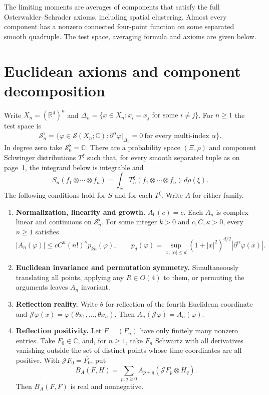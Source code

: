 \documentclass[11pt,letterpaper]{article}
\newcommand{\R}{\mathbb R}
\newcommand{\C}{\mathbb C}
\newcommand{\J}{\mathcal J}
\begin{document}
The limiting moments are averages of components that satisfy the full
Osterwalder--Schrader axioms, including spatial clustering. Almost every
component has a nonzero connected four-point function on some separated
smooth quadruple. The test space, averaging formula and axioms are given below.

\newpage
\section*{Euclidean axioms and component decomposition}

Write $X_n=(\R^4)^n$ and $\Delta_n=\{x\in X_n:x_i=x_j\text{ for some }i\ne j\}$.
For $n\ge1$ the test space is
\[
 \mathcal S_n^{\flat}
 =\{\varphi\in\mathcal S(X_n;\C):
          \partial^\alpha\varphi|_{\Delta_n}=0\ \text{for every multi-index }\alpha\}.
\]
In degree zero take $\mathcal S_0^{\flat}=\C$. There are a probability space
$(\Xi,\rho)$ and component Schwinger distributions $T^\xi$ such that, for
every smooth separated tuple as on page~1, the integrand below is integrable and
\[
 S_n(f_1\otimes\cdots\otimes f_n)
       =\int_\Xi T^\xi_n(f_1\otimes\cdots\otimes f_n)\,d\rho(\xi).
\]
The following conditions hold for $S$ and for each $T^\xi$. Write $A$ for
either family.
\begin{enumerate}
\item \textbf{Normalization, linearity and growth.}
$A_0(c)=c$. Each $A_n$ is complex linear and continuous on $\mathcal S_n^{\flat}$.
For some integer $k>0$ and $c,C,\kappa>0$, every $n\ge1$ satisfies
\[
 |A_n(\varphi)|\le cC^n(n!)^\kappa p_{kn}(\varphi),\qquad
 p_d(\varphi)=\sup_{x,\,|\alpha|\le d}
             (1+|x|^2)^{d/2}|\partial^\alpha\varphi(x)|.
\]
\item \textbf{Euclidean invariance and permutation symmetry.}
Simultaneously translating all points, applying any $R\in O(4)$ to them,
or permuting the arguments leaves $A_n$ invariant.
\item \textbf{Reflection reality.} Write $\theta$ for reflection of the fourth
Euclidean coordinate and
$\J\varphi(x)=\overline{\varphi(\theta x_1,\ldots,\theta x_n)}$.
Then $A_n(\J\varphi)=\overline{A_n(\varphi)}$.
\item \textbf{Reflection positivity.} Let $F=(F_n)$ have only finitely many
nonzero entries. Take $F_0\in\C$, and, for $n\ge1$, take $F_n$ Schwartz with
all derivatives vanishing outside the set of distinct points whose time
coordinates are all positive. With $\J F_0=\overline{F_0}$, put
\[
 B_A(F,H)=\sum_{p,q\ge0} A_{p+q}(\J F_p\otimes H_q).
\]
Then $B_A(F,F)$ is real and nonnegative.
\end{enumerate}
\end{document}

